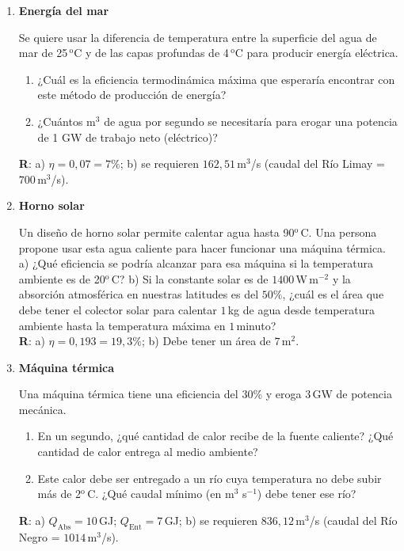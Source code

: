 \documentclass[a4paper,12pt]{article}
\begin{document}
\begin{enumerate}
	\item {\bf{Energía del mar}}
		
		Se quiere usar la diferencia de temperatura entre la superficie del
		agua de mar de 25\,$^\mathrm{o}$C y de las capas profundas de
		4\,$^\mathrm{o}$C para producir energía eléctrica.
		\begin{enumerate}
			\item ¿Cuál es la eficiencia termodinámica máxima que esperaría
				encontrar con este método de producción de energía?
			\item ¿Cuántos m$^3$ de agua por segundo se necesitaría para
				erogar una potencia de 1 GW de trabajo neto (eléctrico)?
		\end{enumerate}
		{\bf{R}}: a) $\eta=0,07 = 7\%$; b) se requieren $162,51$\,m$^3$/s
		(caudal del Río Limay = $700$\,m$^3$/s). 

	\item {\bf{Horno solar}}
		
		Un diseño de horno solar permite calentar agua hasta
		90$^\mathrm{o}$\,C. Una persona propone usar esta agua caliente para
		hacer funcionar una máquina térmica. a) ¿Qué eficiencia se podría alcanzar
		para esa máquina si la temperatura ambiente es de 20$^\mathrm{o}$\,C?
		b) Si la constante solar es de $1400$\,W\,m$^{-2}$ y la absorción atmosférica
		en nuestras latitudes es del $50\%$, ¿cuál es el área que debe tener el
		colector solar para calentar $1$\,kg de agua desde temperatura ambiente
		hasta la temperatura máxima en $1$\,minuto?
		\\{\bf{R}}: a) $\eta=0,193 = 19,3\%$; b) Debe tener un área de
		$7$\,m$^2$. 
	
	\item {\bf{Máquina térmica}}
		
		Una máquina térmica tiene una eficiencia del 30\% y eroga $3$\,GW de
		potencia mecánica.
		\begin{enumerate}
			\item En un segundo, ¿qué cantidad de calor recibe de la fuente
				caliente? ¿Qué cantidad de calor entrega al medio ambiente?
			\item Este calor debe ser entregado a un río cuya temperatura no
				debe subir más de 2$^\mathrm{o}$\,C. ¿Qué caudal mínimo (en
				m$^3$ s$^{-1}$) debe tener ese río?
		\end{enumerate}
		{\bf{R}}: a) $Q_{\mathrm{Abs}}=10$\,GJ; $Q_{\mathrm{Ent}}=7$\,GJ; b) se
		requieren $836,12$\,m$^3$/s (caudal del Río Negro = $1014$\,m$^3$/s). 
	

\end{enumerate}
\end{document}
